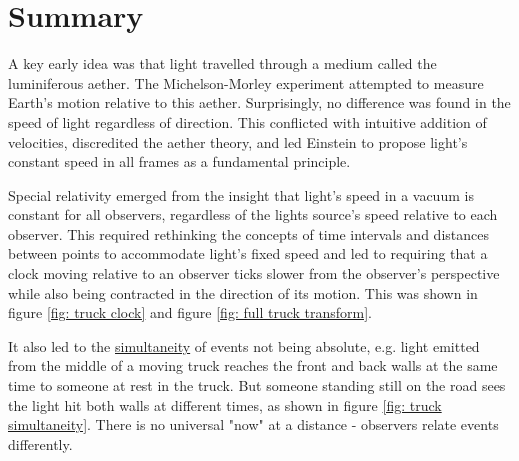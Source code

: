 



\section{Summary}

A key early idea was that light travelled through a medium called the luminiferous aether. The Michelson-Morley experiment attempted to measure Earth's motion relative to this aether. Surprisingly, no difference was found in the speed of light regardless of direction. This conflicted with intuitive addition of velocities, discredited the aether theory, and led Einstein to propose light's constant speed in all frames as a fundamental principle.

Special relativity emerged from the insight that light's speed in a vacuum is constant for all observers, regardless of the lights source's speed relative to each observer. This required rethinking the concepts of time intervals and distances between points to accommodate light's fixed speed and led to requiring that a clock moving relative to an observer ticks slower from the observer's perspective while also being contracted in the direction of its motion. This was shown in figure \ref{fig: truck clock} and figure \ref{fig: full truck transform}.

It also led to the \hyperlink{def-simultaneity}{simultaneity} of events not being absolute, e.g. light emitted from the middle of a moving truck reaches the front and back walls at the same time to someone at rest in the truck. But someone standing still on the road sees the light hit both walls at different times, as shown in figure \ref{fig: truck simultaneity}. There is no universal "now" at a distance - observers relate events differently.

